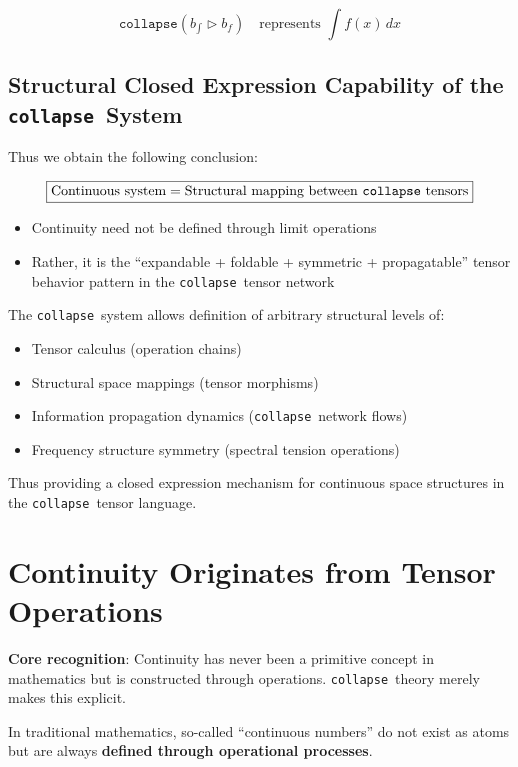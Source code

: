\documentclass[12pt,a4paper]{article}
\theoremstyle{plain}
\theoremstyle{definition}
\theoremstyle{remark}
\newcommand{\collapse}{\texttt{collapse}}
\begin{document}
\begin{equation}
\boxed{
\collapse(b_{\int} \triangleright b_f)
}
\quad \text{represents } \int f(x)\, dx
\end{equation}

\subsection{Structural Closed Expression Capability of the \collapse\ System}

Thus we obtain the following conclusion:

\begin{equation}
\boxed{
\text{Continuous system} = \text{Structural mapping between \collapse\ tensors}
}
\end{equation}

\begin{itemize}
\item Continuity need not be defined through limit operations
\item Rather, it is the ``expandable + foldable + symmetric + propagatable'' tensor behavior pattern in the \collapse\ tensor network
\end{itemize}

The \collapse\ system allows definition of arbitrary structural levels of:
\begin{itemize}
\item Tensor calculus (operation chains)
\item Structural space mappings (tensor morphisms)
\item Information propagation dynamics (\collapse\ network flows)
\item Frequency structure symmetry (spectral tension operations)
\end{itemize}

Thus providing a closed expression mechanism for continuous space structures in the \collapse\ tensor language.

\section{Continuity Originates from Tensor Operations}

\textbf{Core recognition}: Continuity has never been a primitive concept in mathematics but is constructed through operations. \collapse\ theory merely makes this explicit.

In traditional mathematics, so-called ``continuous numbers'' do not exist as atoms but are always \textbf{defined through operational processes}.
\end{document}
